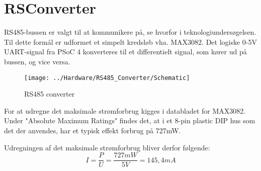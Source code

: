 \section{RSConverter}
RS485-bussen er valgt til at kommunikere på, se hvorfor i teknologiundersøgelsen. Til dette formål er udformet et simpelt kredsløb vha. MAX3082. Det logiske 0-5V UART-signal fra PSoC 4 konverteres til et differentielt signal, som kører ud på bussen, og vice versa.

\begin{figure}[H]
	\centering
	\texttt{[image: ../Hardware/RS485\_Converter/Schematic]}
	\caption{RS485 converter}
	\label{photo:RS485converter}
\end{figure}

For at udregne det maksimale strømforbrug kigges i databladet for MAX3082. Under "Absolute Maximum Ratings" findes det, at i et 8-pin plastic DIP hus som det der anvendes, har et typisk effekt forbrug på 727mW.

Udregningen af det maksimale strømforbrug bliver derfor følgende:
\begin{equation}
	I = \frac{P}{U} = \frac{727mW}{5V} = 145,4mA
\end{equation}

